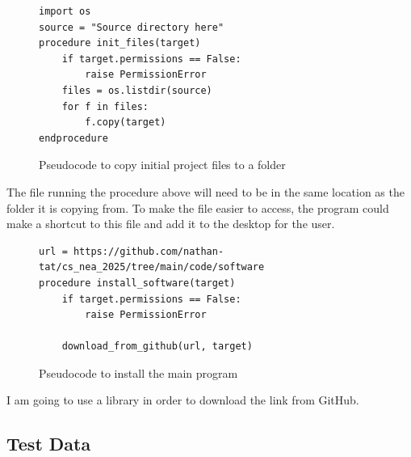 \documentclass[11pt]{article}
\begin{document}
            \begin{figure}[!ht]
                \begin{verbatim}
import os
source = "Source directory here"
procedure init_files(target)
    if target.permissions == False:
        raise PermissionError
    files = os.listdir(source)
    for f in files:
        f.copy(target)
endprocedure
                \end{verbatim}
                \caption{Pseudocode to copy initial project files to a folder}
                \label{pc:copy_to_folder}
            \end{figure}

            The file running the procedure above will need to be in the same location as the folder it is copying from. To make the file easier to access, the program could make a shortcut to this file and add it to the desktop for the user.
            
            \begin{figure}[!ht]
               \begin{verbatim}
url = https://github.com/nathan-tat/cs_nea_2025/tree/main/code/software
procedure install_software(target)
    if target.permissions == False:
        raise PermissionError
    
    download_from_github(url, target)
               \end{verbatim}
               \caption{Pseudocode to install the main program}
               \label{pc:install_sw}
            \end{figure}

            I am going to use a library in order to download the link from GitHub.
        \subsection{Test Data}


\end{document}
